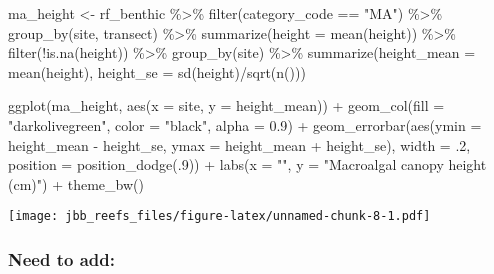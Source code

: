 \documentclass[
]{article}
\newenvironment{Shaded}{\begin{snugshade}}{\end{snugshade}}
\newcommand{\AttributeTok}[1]{\textcolor[rgb]{0.77,0.63,0.00}{#1}}
\newcommand{\DecValTok}[1]{\textcolor[rgb]{0.00,0.00,0.81}{#1}}
\newcommand{\FloatTok}[1]{\textcolor[rgb]{0.00,0.00,0.81}{#1}}
\newcommand{\FunctionTok}[1]{\textcolor[rgb]{0.00,0.00,0.00}{#1}}
\newcommand{\NormalTok}[1]{#1}
\newcommand{\OtherTok}[1]{\textcolor[rgb]{0.56,0.35,0.01}{#1}}
\newcommand{\SpecialCharTok}[1]{\textcolor[rgb]{0.00,0.00,0.00}{#1}}
\newcommand{\StringTok}[1]{\textcolor[rgb]{0.31,0.60,0.02}{#1}}
\begin{document}
\begin{Shaded}
\begin{Highlighting}[]
\NormalTok{ma\_height }\OtherTok{\textless{}{-}}\NormalTok{ rf\_benthic }\SpecialCharTok{\%\textgreater{}\%}
  \FunctionTok{filter}\NormalTok{(category\_code }\SpecialCharTok{==} \StringTok{"MA"}\NormalTok{) }\SpecialCharTok{\%\textgreater{}\%}
  \FunctionTok{group\_by}\NormalTok{(site, transect) }\SpecialCharTok{\%\textgreater{}\%}
  \FunctionTok{summarize}\NormalTok{(}\AttributeTok{height =} \FunctionTok{mean}\NormalTok{(height)) }\SpecialCharTok{\%\textgreater{}\%}
  \FunctionTok{filter}\NormalTok{(}\SpecialCharTok{!}\FunctionTok{is.na}\NormalTok{(height)) }\SpecialCharTok{\%\textgreater{}\%}
  \FunctionTok{group\_by}\NormalTok{(site) }\SpecialCharTok{\%\textgreater{}\%}
  \FunctionTok{summarize}\NormalTok{(}\AttributeTok{height\_mean =} \FunctionTok{mean}\NormalTok{(height),}
            \AttributeTok{height\_se =} \FunctionTok{sd}\NormalTok{(height)}\SpecialCharTok{/}\FunctionTok{sqrt}\NormalTok{(}\FunctionTok{n}\NormalTok{()))}

\FunctionTok{ggplot}\NormalTok{(ma\_height, }\FunctionTok{aes}\NormalTok{(}\AttributeTok{x =}\NormalTok{ site, }\AttributeTok{y =}\NormalTok{ height\_mean)) }\SpecialCharTok{+}
  \FunctionTok{geom\_col}\NormalTok{(}\AttributeTok{fill =} \StringTok{"darkolivegreen"}\NormalTok{, }\AttributeTok{color =} \StringTok{"black"}\NormalTok{, }\AttributeTok{alpha =} \FloatTok{0.9}\NormalTok{) }\SpecialCharTok{+}
  \FunctionTok{geom\_errorbar}\NormalTok{(}\FunctionTok{aes}\NormalTok{(}\AttributeTok{ymin =}\NormalTok{ height\_mean }\SpecialCharTok{{-}}\NormalTok{ height\_se, }\AttributeTok{ymax =}\NormalTok{ height\_mean }\SpecialCharTok{+}\NormalTok{ height\_se), }\AttributeTok{width =}\NormalTok{ .}\DecValTok{2}\NormalTok{,}
                 \AttributeTok{position =} \FunctionTok{position\_dodge}\NormalTok{(.}\DecValTok{9}\NormalTok{)) }\SpecialCharTok{+}
  \FunctionTok{labs}\NormalTok{(}\AttributeTok{x =} \StringTok{""}\NormalTok{, }\AttributeTok{y =} \StringTok{"Macroalgal canopy height (cm)"}\NormalTok{) }\SpecialCharTok{+}
  \FunctionTok{theme\_bw}\NormalTok{()}
\end{Highlighting}
\end{Shaded}

\texttt{[image: jbb\_reefs\_files/figure-latex/unnamed-chunk-8-1.pdf]}

\hypertarget{need-to-add}{%
\subsubsection{Need to add:}\label{need-to-add}}
\end{document}
